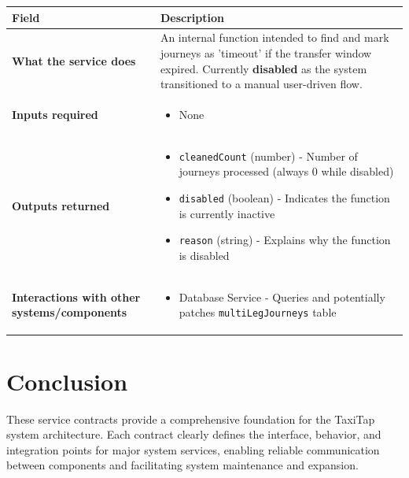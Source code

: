 \documentclass[11pt,a4paper]{article}
\begin{document}
\begin{longtable}{|p{4cm}|p{12cm}|}
\hline
\textbf{Field} & \textbf{Description} \\
\hline
\textbf{What the service does} & 
An internal function intended to find and mark journeys as 'timeout' if the transfer window expired. Currently \textbf{disabled} as the system transitioned to a manual user-driven flow. \\
\hline
\textbf{Inputs required} & 
\begin{itemize}[nosep]
\item None
\end{itemize} \\
\hline
\textbf{Outputs returned} & 
\begin{itemize}[nosep]
\item \texttt{cleanedCount} (number) - Number of journeys processed (always 0 while disabled)
\item \texttt{disabled} (boolean) - Indicates the function is currently inactive
\item \texttt{reason} (string) - Explains why the function is disabled
\end{itemize} \\
\hline
\textbf{Interactions with other systems/components} & 
\begin{itemize}[nosep]
\item Database Service - Queries and potentially patches \texttt{multiLegJourneys} table
\end{itemize} \\
\hline
\end{longtable}

\section{Conclusion}
\label{sec:conclusion}

These service contracts provide a comprehensive foundation for the TaxiTap system architecture. Each contract clearly defines the interface, behavior, and integration points for major system services, enabling reliable communication between components and facilitating system maintenance and expansion.
\end{document}
